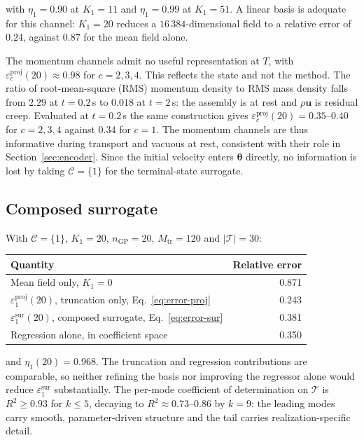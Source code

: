 \documentclass[11pt]{article}
\newcommand{\bs}[1]{\boldsymbol{#1}}
\begin{document}
with $\eta_1 = 0.90$ at $K_1 = 11$ and $\eta_1 = 0.99$ at $K_1 = 51$. A linear basis is
adequate for this channel: $K_1 = 20$ reduces a $16\,384$-dimensional field to a relative
error of $0.24$, against $0.87$ for the mean field alone.

The momentum channels admit no useful representation at $T$, with
$\varepsilon^{\text{proj}}_c(20) \approx 0.98$ for $c = 2,3,4$. This reflects the state and
not the method. The ratio of root-mean-square (RMS) momentum density to RMS mass density
falls from $2.29$ at $t = 0.2$\,s to $0.018$ at $t = 2$\,s: the assembly is at rest and
$\rho \bs{u}$ is residual creep. Evaluated at $t = 0.2$\,s the same construction gives
$\varepsilon^{\text{proj}}_c(20) = 0.35$--$0.40$ for $c = 2,3,4$ against $0.34$ for $c = 1$.
The momentum channels are thus informative during transport and vacuous at rest, consistent
with their role in Section~\ref{sec:encoder}. Since the initial velocity enters
$\bs{\theta}$ directly, no information is lost by taking $\mathcal{C} = \{1\}$ for the
terminal-state surrogate.

\subsection{Composed surrogate}

With $\mathcal{C} = \{1\}$, $K_1 = 20$, $n_{\mathrm{GP}} = 20$, $M_{\mathrm{tr}} = 120$ and
$|\mathcal{T}| = 30$:

\begin{center}
\begin{tabular}{lr}
\toprule
Quantity & Relative error \\
\midrule
Mean field only, $K_1 = 0$ & 0.871 \\
$\varepsilon^{\text{proj}}_1(20)$, truncation only, Eq.~\eqref{eq:error-proj} & 0.243 \\
$\varepsilon^{\text{sur}}_1(20)$, composed surrogate, Eq.~\eqref{eq:error-sur} & 0.381 \\
Regression alone, in coefficient space & 0.350 \\
\bottomrule
\end{tabular}
\end{center}

and $\eta_1(20) = 0.968$. The truncation and regression contributions are comparable, so
neither refining the basis nor improving the regressor alone would reduce
$\varepsilon^{\text{sur}}_1$ substantially. The per-mode coefficient of determination on
$\mathcal{T}$ is $R^2 \geq 0.93$ for $k \leq 5$, decaying to $R^2 \approx 0.73$--$0.86$ by
$k = 9$: the leading modes carry smooth, parameter-driven structure and the tail carries
realization-specific detail.
\end{document}
